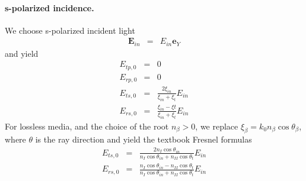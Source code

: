 \documentclass[12pt,a4paper,twoside,openright,BCOR10mm,headsepline,titlepage,abstracton,chapterprefix,final]{scrreprt}
\newcommand\Vector[1]{{\mathbf{#1}}}
\newcommand\wavenumber{k}
\newcommand\scalarEfield{E}
\newcommand\Efield{\Vector{\scalarEfield}}
\newcommand\materialone{I}
\newcommand\materialtwo{{II}}
\newcommand\ppol{p}
\newcommand\spol{s}
\begin{document}
\paragraph{s-polarized incidence.}
We choose s-polarized incident light 
\begin{eqnarray}
\Efield_{in} &=& E_{in} \Vector{e}_Y 
\end{eqnarray}
and yield
\begin{subequations}
  \begin{eqnarray}
    E_{t \ppol,0} &=& 0 \\
    E_{r \ppol,0} &=& 0 \\ 
    E_{t \spol,0} &=& \frac{ 2 \xi_{in}        }{\xi_{in} + \xi_t} E_{in} \\
    E_{r \spol,0} &=& \frac{ \xi_{in} - \xi{t} }{\xi_{in} + \xi_t} E_{in} 
  \end{eqnarray}
\end{subequations}
For lossless media, and the choice of the root $n_\beta > 0$, 
we replace $\xi_\beta = \wavenumber_0 n_\beta \cos \theta_\beta$, where $\theta$ is the ray direction
and yield the textbook Fresnel formulas \cite{Jackson, BornWolf}
\begin{subequations}
  \begin{eqnarray}
    E_{t \spol,0} &=& \frac{ 2 n_\materialone \cos \theta_{in} }
                           { n_\materialone \cos \theta_{in} + n_\materialtwo \cos \theta_t } E_{in}  
    \\[2ex]
    E_{r \spol,0} &=& \frac{ n_\materialone \cos \theta_{in} - n_\materialtwo \cos \theta_t }
                           { n_\materialone \cos \theta_{in} + n_\materialtwo \cos \theta_t } E_{in} 
  \end{eqnarray}
\end{subequations}
\end{document}
